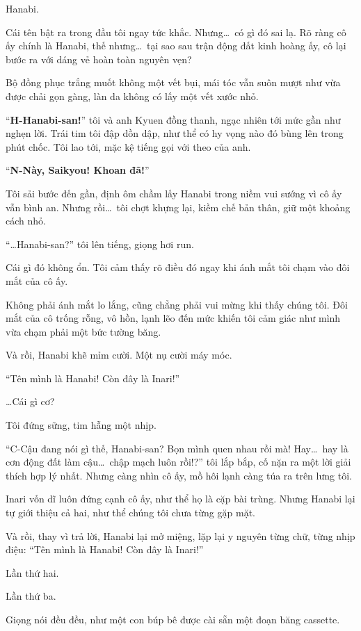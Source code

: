 \documentclass[../main.tex]{subfiles}
\begin{document}

Hanabi.

Cái tên bật ra trong đầu tôi ngay tức khắc. Nhưng\dots\ có gì đó sai lạ. Rõ ràng cô ấy chính là Hanabi, thế nhưng\dots\ tại sao sau trận động đất kinh hoàng ấy, cô lại bước ra với dáng vẻ hoàn toàn nguyên vẹn?

Bộ đồng phục trắng muốt không một vết bụi, mái tóc vẫn suôn mượt như vừa được chải gọn gàng, làn da không có lấy một vết xước nhỏ.

``\textbf{H-Hanabi-san!}'' tôi và anh Kyuen đồng thanh, ngạc nhiên tới mức gần như nghẹn lời. Trái tim tôi đập dồn dập, như thể có hy vọng nào đó bùng lên trong phút chốc. Tôi lao tới, mặc kệ tiếng gọi với theo của anh.

``\textbf{N-Này, Saikyou! Khoan đã!}''

Tôi sải bước đến gần, định ôm chầm lấy Hanabi trong niềm vui sướng vì cô ấy vẫn bình an. Nhưng rồi\dots\ tôi chợt khựng lại, kiềm chế bản thân, giữ một khoảng cách nhỏ.

``\dots Hanabi-san?'' tôi lên tiếng, giọng hơi run.

Cái gì đó không ổn. Tôi cảm thấy rõ điều đó ngay khi ánh mắt tôi chạm vào đôi mắt của cô ấy.

Không phải ánh mắt lo lắng, cũng chẳng phải vui mừng khi thấy chúng tôi. Đôi mắt của cô trống rỗng, vô hồn, lạnh lẽo đến mức khiến tôi cảm giác như mình vừa chạm phải một bức tường băng.

Và rồi, Hanabi khẽ mỉm cười. Một nụ cười máy móc.

``Tên mình là Hanabi! Còn đây là Inari!''

\dots Cái gì cơ?

Tôi đứng sững, tim hẫng một nhịp.

``C-Cậu đang nói gì thế, Hanabi-san? Bọn mình quen nhau rồi mà! Hay\dots\ hay là cơn động đất làm cậu\dots\ chập mạch luôn rồi!?'' tôi lắp bắp, cố nặn ra một lời giải thích hợp lý nhất. Nhưng càng nhìn cô ấy, mồ hôi lạnh càng túa ra trên lưng tôi.

Inari vốn dĩ luôn đứng cạnh cô ấy, như thể họ là cặp bài trùng. Nhưng Hanabi lại tự giới thiệu cả hai, như thể chúng tôi chưa từng gặp mặt.

Và rồi, thay vì trả lời, Hanabi lại mở miệng, lặp lại y nguyên từng chữ, từng nhịp điệu: ``Tên mình là Hanabi! Còn đây là Inari!''

Lần thứ hai.

Lần thứ ba.

Giọng nói đều đều, như một con búp bê được cài sẵn một đoạn băng cassette.
\end{document}
